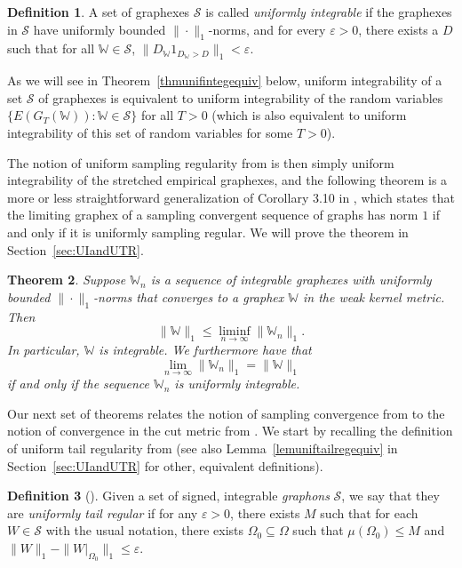\documentclass{amsart}
\numberwithin{equation}{section}
\numberwithin{figure}{section}
\newtheorem{theorem}{Theorem}[section]
\theoremstyle{definition}
\newtheorem{definition}[theorem]{Definition}
\theoremstyle{remark}
\newcommand{\cW}{\mathbb{W}}
\newcommand{\cS}{\mathcal{S}}
\begin{document}
\begin{definition}\label{def:UI}
A set of graphexes $\mathcal{S}$ is called \emph{uniformly integrable} if the
graphexes in $\cS$ have uniformly bounded $\|\cdot\|_1$-norms, and for every
$\varepsilon>0$, there exists a $D$ such that for all $\cW \in \mathcal{S}$,
$\|D_{\cW} 1_{D_{\cW}>D}\|_1<\varepsilon$.
\end{definition}

As we will see in Theorem~\ref{thmunifintegequiv} below, uniform
integrability of a set $\cS$ of graphexes is equivalent to uniform
integrability of the random variables $\{E(G_T(\cW)):\cW \in \cS\}$ for all
$T>0$ (which is also equivalent to uniform integrability of this set of
random variables for some $T>0$).

The notion of uniform sampling regularity from \cite{BCCV17} is then simply
uniform integrability of the stretched empirical graphexes, and the following
theorem is a more or less straightforward generalization of Corollary 3.10 in
\cite{BCCV17}, which states that the limiting graphex of a sampling
convergent sequence of graphs has norm $1$ if and only if it is uniformly
sampling regular. We will prove the theorem in Section~\ref{sec:UIandUTR}.

\begin{theorem}\label{thm:UI-norm-convergence}
Suppose $\cW_n$ is a sequence of integrable graphexes with uniformly bounded
$\|\cdot\|_1$-norms that converges to a graphex $\cW$ in the weak kernel
metric. Then
\[
\|\cW\|_1 \le \liminf_{n \to \infty} \|\cW_n\|_1.
\]
In particular, $\cW$ is integrable. We furthermore have that
\[
\lim_{n \to \infty} \|\cW_n\|_1 = \|\cW\|_1
\]
if and only if the sequence $\cW_n$ is uniformly integrable.
\end{theorem}

Our next set of theorems relates the notion of sampling convergence from
\cite{BCCV17} to the notion of convergence in the cut metric from
\cite{BCCH16}. We start by recalling the definition of uniform tail
regularity from \cite{BCCH16} (see also Lemma~\ref{lemuniftailregequiv} in
Section~\ref{sec:UIandUTR} for other, equivalent definitions).

\begin{definition}[\cite{BCCH16}]
Given a set of signed, integrable \emph{graphons} $\cS$, we say that they are
\emph{uniformly tail regular} if for any $\varepsilon>0$, there exists $M$
such that for each $W\in \cS$ with the usual notation, there exists $\Omega_0
\subseteq \Omega$ such that $\mu(\Omega_0) \le M$ and $\|W\|_1 -
\|W|_{\Omega_0}\|_1 \le \varepsilon$.
\end{definition}
\end{document}
